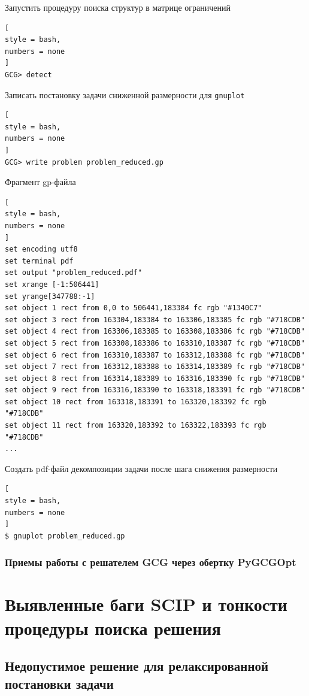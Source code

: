 \documentclass[%
	11pt,
	a4paper,
	utf8,
		]{article}
\begin{document}
Запустить процедуру поиска структур в матрице ограничений
\begin{lstlisting}[
style = bash,
numbers = none
]
GCG> detect
\end{lstlisting}

Записать постановку задачи сниженной размерности для \texttt{gnuplot}
\begin{lstlisting}[
style = bash,
numbers = none
]
GCG> write problem problem_reduced.gp
\end{lstlisting}

Фрагмент gp-файла
\begin{lstlisting}[
style = bash,
numbers = none
]
set encoding utf8
set terminal pdf
set output "problem_reduced.pdf"
set xrange [-1:506441]
set yrange[347788:-1]
set object 1 rect from 0,0 to 506441,183384 fc rgb "#1340C7"
set object 3 rect from 163304,183384 to 163306,183385 fc rgb "#718CDB" 
set object 4 rect from 163306,183385 to 163308,183386 fc rgb "#718CDB" 
set object 5 rect from 163308,183386 to 163310,183387 fc rgb "#718CDB" 
set object 6 rect from 163310,183387 to 163312,183388 fc rgb "#718CDB" 
set object 7 rect from 163312,183388 to 163314,183389 fc rgb "#718CDB" 
set object 8 rect from 163314,183389 to 163316,183390 fc rgb "#718CDB" 
set object 9 rect from 163316,183390 to 163318,183391 fc rgb "#718CDB" 
set object 10 rect from 163318,183391 to 163320,183392 fc rgb "#718CDB" 
set object 11 rect from 163320,183392 to 163322,183393 fc rgb "#718CDB" 
...
\end{lstlisting}

Создать pdf-файл декомпозиции задачи после шага снижения размерности
\begin{lstlisting}[
style = bash,
numbers = none
]
$ gnuplot problem_reduced.gp
\end{lstlisting}

\subsubsection{Приемы работы с решателем GCG через обертку PyGCGOpt}

\section{Выявленные баги SCIP и тонкости процедуры поиска решения}

\subsection{Недопустимое решение для релаксированной постановки задачи}
\end{document}
